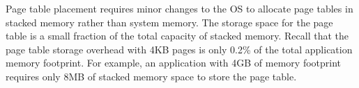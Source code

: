Page table placement requires minor changes to the OS to allocate page
tables in stacked memory rather than system memory. The storage space
for the page table is a small fraction of the total capacity of
stacked memory. Recall that the page table storage overhead with 4KB
pages is only 0.2\% of the total application memory footprint. For
example, an application with 4GB of memory footprint requires only 8MB
of stacked memory space to store the page table.

% 
% 





